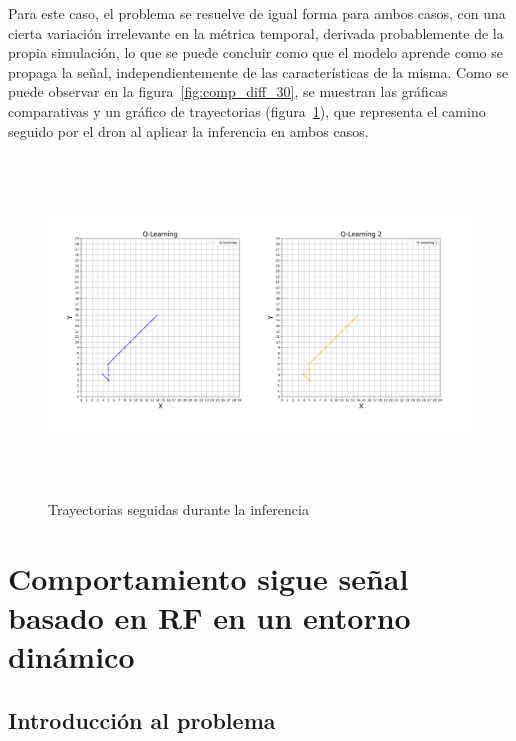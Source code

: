 Para este caso, el problema se resuelve de igual forma para ambos casos, con una cierta variación irrelevante en la métrica temporal, derivada probablemente de la propia simulación, lo que se puede concluir como que el modelo aprende como se propaga la señal, independientemente de las características de la misma. Como se puede observar en la figura~\ref{fig:comp_diff_30}, se muestran las gráficas comparativas y un gráfico de trayectorias (figura~\ref{fig:12_traj}), que representa el camino seguido por el dron al aplicar la inferencia en ambos casos.\\

\begin{figure} [tp]
    \begin{center}
    \includegraphics[height=9cm]{imagenes/cap4/13_trayectorias_12.png}
    \end{center}
    \caption[Trayectorias seguidas durante la inferencia]{Trayectorias seguidas durante la inferencia}
    \label{fig:12_traj}
\end{figure}

\section{Comportamiento sigue señal basado en \ac{RF} en un entorno dinámico}
\label{sec:signal_follow_obs}

\subsection{Introducción al problema}
\label{subsec:intro_sfo}


